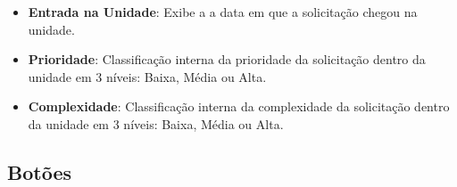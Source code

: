 \begin{itemize}
\begin{itemize}
				\item \textbf{Entrada na Unidade}: Exibe a a data em que a solicitação chegou na unidade.

				\item \textbf{Prioridade}: Classificação interna da prioridade da solicitação dentro da unidade em 3 níveis: Baixa, Média ou Alta.
				
				\item \textbf{Complexidade}: Classificação interna da complexidade da solicitação dentro da unidade em 3 níveis: Baixa, Média ou Alta.	
			\end{itemize}
	\end{itemize}

	\subsection{Botões} 	

